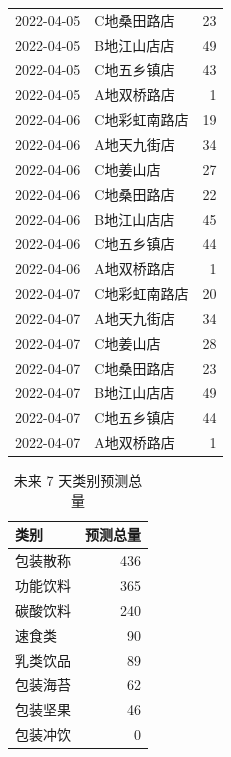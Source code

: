 \begin{longtable}{clr}
2022-04-05 & C地桑田路店 & 23 \\
2022-04-05 & B地江山店店 & 49 \\
2022-04-05 & C地五乡镇店 & 43 \\
2022-04-05 & A地双桥路店 & 1 \\
2022-04-06 & C地彩虹南路店 & 19 \\
2022-04-06 & A地天九街店 & 34 \\
2022-04-06 & C地姜山店 & 27 \\
2022-04-06 & C地桑田路店 & 22 \\
2022-04-06 & B地江山店店 & 45 \\
2022-04-06 & C地五乡镇店 & 44 \\
2022-04-06 & A地双桥路店 & 1 \\
2022-04-07 & C地彩虹南路店 & 20 \\
2022-04-07 & A地天九街店 & 34 \\
2022-04-07 & C地姜山店 & 28 \\
2022-04-07 & C地桑田路店 & 23 \\
2022-04-07 & B地江山店店 & 49 \\
2022-04-07 & C地五乡镇店 & 44 \\
2022-04-07 & A地双桥路店 & 1 \\
\bottomrule
\end{longtable}
\endgroup

\begin{table}[H]
\centering
\caption{未来 7 天类别预测总量}
\begin{tabular}{lr}
\toprule
类别 & 预测总量 \\
\midrule
包装散称 & 436 \\
功能饮料 & 365 \\
碳酸饮料 & 240 \\
速食类 & 90 \\
乳类饮品 & 89 \\
包装海苔 & 62 \\
包装坚果 & 46 \\
包装冲饮 & 0 \\
\bottomrule
\end{tabular}
\end{table}

